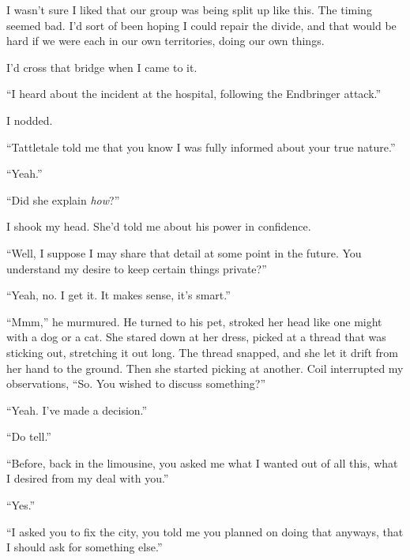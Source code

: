 I wasn't sure I liked that our group was being split up like this.  The timing seemed bad.  I'd sort of been hoping I could repair the divide, and that would be hard if we were each in our own territories, doing our own things.



I'd cross that bridge when I came to it.



``I heard about the incident at the hospital, following the Endbringer attack.''



I nodded.



``Tattletale told me that you know I was fully informed about your true nature.''



``Yeah.''



``Did she explain \emph{how}?''



I shook my head.  She'd told me about his power in confidence.



``Well, I suppose I may share that detail at some point in the future.  You understand my desire to keep certain things private?''



``Yeah, no.  I get it.  It makes sense, it's smart.''



``Mmm,'' he murmured.  He turned to his pet, stroked her head like one might with a dog or a cat.  She stared down at her dress, picked at a thread that was sticking out, stretching it out long.  The thread snapped, and she let it drift from her hand to the ground.  Then she started picking at another.  Coil interrupted my observations, ``So.  You wished to discuss something?''



``Yeah.  I've made a decision.''



``Do tell.''



``Before, back in the limousine, you asked me what I wanted out of all this, what I desired from my deal with you.''



``Yes.''



``I asked you to fix the city, you told me you planned on doing that anyways, that I should ask for something else.''



